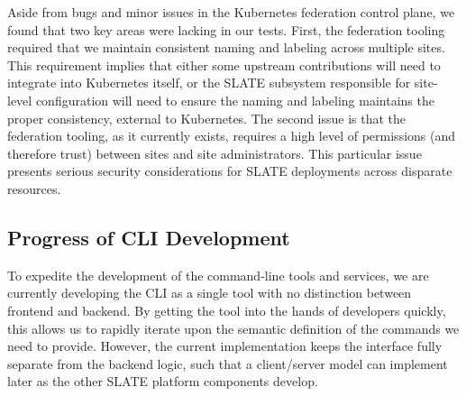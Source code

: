 \documentclass[sigconf]{acmart}
\begin{document}
Aside from bugs and minor issues in the Kubernetes federation control plane, we found that two key areas were lacking in our tests. First, the federation tooling required that we maintain consistent naming and labeling across multiple sites. This requirement implies that either some upstream contributions will need to integrate into Kubernetes itself, or the SLATE subsystem responsible for site-level configuration will need to ensure the naming and labeling maintains the proper consistency, external to Kubernetes. The second issue is that the federation tooling, as it currently exists, requires a high level of permissions (and therefore trust) between sites and site administrators. This particular issue presents serious security considerations for SLATE deployments across disparate resources. 



\subsection{Progress of CLI Development}

To expedite the development of the command-line tools and services, we are currently developing the CLI as a single tool with no distinction between frontend and backend. By getting the tool into the hands of developers quickly, this allows us to rapidly iterate upon the semantic definition of the commands we need to provide. However, the current implementation keeps the interface fully separate from the backend logic, such that a client/server model can implement later as the other SLATE platform components develop. 
\end{document}
